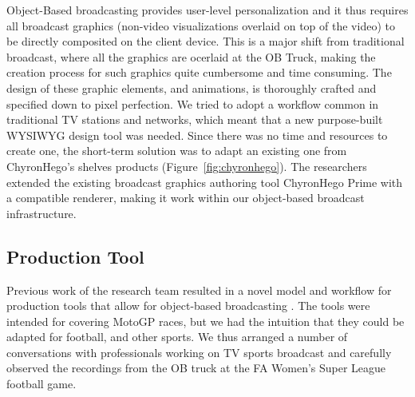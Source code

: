 \documentclass[sigchi-a, authorversion]{acmart}
\begin{document}
Object-Based broadcasting provides user-level personalization and it thus requires all broadcast graphics (non-video visualizations overlaid on top of the video) to be directly composited on the client device. This is a major shift from traditional broadcast, where all the graphics are ocerlaid at the OB Truck, making the creation process for such graphics quite cumbersome and time consuming. The design of these graphic elements, and animations, is thoroughly crafted and specified down to pixel perfection. We tried to adopt a workflow common in traditional TV stations and networks, which meant that a new purpose-built WYSIWYG design tool was needed. Since there was no time and resources to create one, the short-term solution was to adapt an existing one from ChyronHego's shelves products (Figure~\ref{fig:chyronhego}). The researchers extended the existing broadcast graphics authoring tool ChyronHego Prime with a compatible renderer, making it work within our object-based broadcast infrastructure.

\subsection{Production Tool}
Previous work of the research team resulted in a novel model and workflow for production tools that allow for object-based broadcasting \cite{Li:2018_TVX}. The tools were intended for covering MotoGP races, but we had the intuition that they could be adapted for football, and other sports. We thus arranged a number of conversations with professionals working on TV sports broadcast and carefully observed the recordings from the OB truck at the FA Women's Super League football game. 
\end{document}

